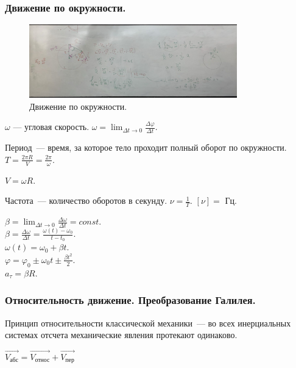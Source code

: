 \documentclass[12pt]{article}
\begin{document}
	\subsubsection{Движение по окружности.}
	\begin{figure}[H]
		\includegraphics[height=120px]{extra-materials/Скорости_Вектора_3}
		\caption{Движение по окружности.}
	\end{figure}
	\begin{definition}
		$\omega$ --- угловая скорость. $\omega = \lim_{\varDelta t \rightarrow 0} \frac{\varDelta \varphi}{\varDelta t}$.
	\end{definition}
	\begin{definition}
		Период~--- время, за которое тело проходит полный оборот по окружности. $T = \frac{2\pi R}{V} = \frac{2\pi}{\omega}$.
	\end{definition}
	\begin{statement}
		$V = \omega R$.
	\end{statement}
	\begin{definition}
		Частота~--- количество оборотов в секунду. $\nu = \frac{1}{T}$. $[\nu] = $ Гц.
	\end{definition}
	\noindent
	$\beta = \lim_{\varDelta t \rightarrow 0} \frac{\varDelta \omega}{\varDelta t} = const$. \\
	$\beta = \frac{\varDelta \omega}{\varDelta t} = \frac{\omega(t) - \omega_0}{t - t_0}$. \\
	$\omega(t) = \omega_0 + \beta t$. \\
	$\varphi = \varphi_0 \pm \omega_0t \pm \frac{\beta t^2}{2}$. \\
	$a_{\tau} = \beta R$.
	\subsubsection{Относительность движение. Преобразование Галилея.}
	\begin{definition}
		Принцип относительности классической механики~--- во всех инерциальных системах отсчета механические явления протекают одинаково.
	\end{definition}
	\noindent
	$\vec{V_{\text{абс}}} = \vec{V_{\text{относ}}} + \vec{V_{\text{пер}}}$
\end{document}
